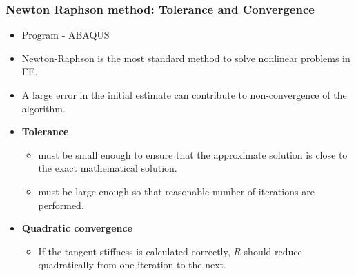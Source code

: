 \documentclass[notes]{beamer}
\begin{document}
\begin{frame}
\frametitle{Newton Raphson method: Tolerance and Convergence}
\begin{itemize}
	\item Program - ABAQUS
	\item Newton-Raphson is the most standard method to solve nonlinear problems in FE.
	\item A large error in the initial estimate can contribute to non-convergence of the algorithm.
	\item \textbf{Tolerance}
	\begin{itemize}
		\item must be small enough to ensure that the approximate
		solution is close to the exact mathematical solution.
		\item must be large enough so that reasonable number of
		iterations are performed.
	\end{itemize}
	\item \textbf{Quadratic convergence}
	\begin{itemize}
		\item If the tangent stiffness is calculated correctly, $R$ should
		reduce quadratically from one iteration to the next.
	\end{itemize}
\end{itemize}
\end{frame}
\end{document}

